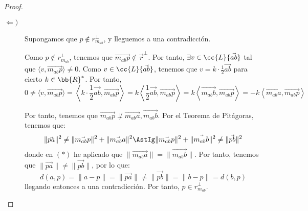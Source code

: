 \begin{proof}
\begin{description}
        \item[$\Longleftarrow)$] Supongamos que $p\notin r_{m_{ab}}^\perp$, y lleguemos a una contradicción.
        
        Como $p\notin r_{m_{ab}}^\perp$, tenemos que $\vec{m_{ab}p}\notin \vec{r}^\perp$. Por tanto, $\exists v\in \cc{L}\{\vec{ab}\}$ tal que $\langle v,\vec{m_{ab}p}\rangle\neq 0$. Como $v\in \cc{L}\{\vec{ab}\}$, tenemos que $v=k\cdot \frac{1}{2}\vec{ab}$ para cierto $k\in \bb{R}^\ast$. Por tanto,
        \begin{equation*}
            0\neq \langle v,\vec{m_{ab}p}\rangle = \left\langle k\cdot \frac{1}{2}\vec{ab},\vec{m_{ab}p}\right\rangle
            = k \left\langle \frac{1}{2}\vec{ab},\vec{m_{ab}p}\right\rangle
            = k \left\langle \vec{m_{ab}b},\vec{m_{ab}p}\right\rangle
            = -k \left\langle \vec{m_{ab}a},\vec{m_{ab}p}\right\rangle
        \end{equation*}

        Por tanto, tenemos que $\vec{m_{ab}p}\not \perp \vec{m_{ab}a},\vec{m_{ab}b}$. Por el Teorema de Pitágoras, tenemos que:
        \begin{equation*}
            \|\vec{pa}\|^2 \neq \|\vec{m_{ab}p}\|^2 + \|\vec{m_{ab}a}\|^2 \AstIg \|\vec{m_{ab}p}\|^2 + \|\vec{m_{ab}b}\|^2 \neq \|\vec{pb}\|^2
        \end{equation*}
        donde en $(\ast)$ he aplicado que $\|\vec{m_{ab}a}\|=\|\vec{m_{ab}b}\|$. Por tanto, tenemos que $\|\vec{pa}\|\neq\|\vec{pb}\|$, por lo que:
        \begin{equation*}
            d(a,p)=\|a-p\| = \|\vec{pa}\|\neq \|\vec{pb}\| = \|b-p\| = d(b,p)
        \end{equation*}
        llegando entonces a una contradicción. Por tanto, $p\in r_{m_{ab}}^\perp$.
    \end{description}
\end{proof}

